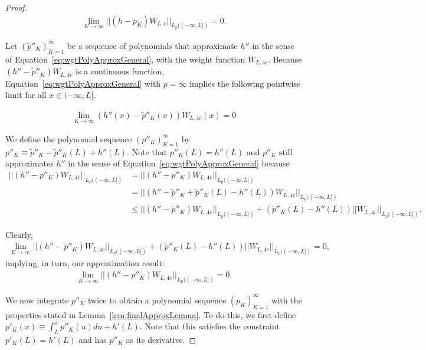 \documentclass[11pt]{article}
\begin{document}
\begin{proof}
\begin{align}\label{eq:wgtPolyApproxGeneral}
    \lim_{K \to \infty} ||(h - p_K)W_{L,c}||_{L_p((-\infty,L])} = 0.
\end{align}

Let $(\tilde{p}''_K)_{K=1}^\infty$ be a sequence of polynomials that approximate $h''$ in the sense of Equation~\ref{eq:wgtPolyApproxGeneral}, with the weight function $W_{L,4c}$. Because $(h'' - \tilde{p}''_K)W_{L,4c}$ is a continuous function, Equation~\ref{eq:wgtPolyApproxGeneral} with $p = \infty$ implies the following pointwise limit for all $x \in (-\infty, L]$.

\begin{align}
    \lim_{K \to \infty} (h''(x) - \tilde{p}''_K(x))W_{L,4c}(x) = 0
\end{align}

We define the polynomial sequence $(p''_K)_{K=1}^\infty$ by $p''_K \equiv \tilde{p}''_K - \tilde{p}''_K(L) + h''(L)$. Note that $p''_K(L) = h''(L)$ and $p''_K$ still approximates $h''$ in the sense of Equation~\ref{eq:wgtPolyApproxGeneral} because
\begin{align} 
    ||(h'' - p''_K)W_{L,4c}||_{L_p((-\infty,L])}
    &= ||(h'' - p''_K)W_{L,4c}||_{L_p((-\infty,L])} \\
    &= ||(h'' - \tilde{p}''_K + \tilde{p}''_K(L) - h''(L))W_{L,4c}||_{L_p((-\infty,L])} \\
    &\leq ||(h'' - \tilde{p}''_K)W_{L,4c}||_{L_p((-\infty,L])} + (\tilde{p}''_K(L) - h''(L))||W_{L,4c}||_{L_p((-\infty,L])}.
\end{align}

Clearly, 
\begin{align}
    \lim_{K \to \infty} ||(h'' - \tilde{p}''_K)W_{L,4c}||_{L_p((-\infty,L])} + (\tilde{p}''_K(L) - h''(L))||W_{L,4c}||_{L_p((-\infty,L])} = 0,
\end{align}
implying, in turn, our approximation result: 
\begin{align} \label{eq:approxRsltDeriv2}
    \lim_{K \to \infty} ||(h'' - p''_K)W_{L,4c}||_{L_p((-\infty,L])} = 0.
\end{align}

We now integrate $p''_K$ twice to obtain a polynomial sequence $(p_K)_{K=1}^\infty$ with the properties stated in Lemma~\ref{lem:finalApproxLemma}. To do this, we first define $p'_K(x) \equiv \int_L^x p''_K(u) du + h'(L)$. Note that this satisfies the constraint $p'_K(L) = h'(L)$ and has $p''_K$ as its derivative.


\end{proof}
\end{document}
